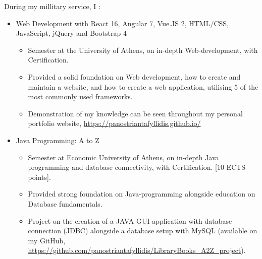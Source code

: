 
During my millitary service, I :
\begin{itemize}
    \item Web Development with React 16, Angular 7, Vue.JS 2, HTML/CSS, JavaScript, jQuery and Bootstrap 4
          \begin{itemize}
              \item Semester at the University of Athens, on in-depth Web-development, with Certification.
              \item Provided a solid foundation on Web development, how to create and maintain a website, and how to create a web application, utilising 5 of the most commonly used frameworks.
              \item Demonstration of my knowledge can be seen throughout my personal portfolio website, \url{https://panostriantafyllidis.github.io/}
          \end{itemize}
    \item Java Programming: A to Z
          \begin{itemize}
              \item Semester at Economic University of Athens, on in-depth Java programming and database connectivity, with Certification. [10 ECTS points].
              \item Provided strong foundation on Java-programming alongside education on Database fundamentals.
              \item Project on the creation of a JAVA GUI application with database connection (JDBC) alongside a database setup with MySQL (available on my GitHub, \url{https://github.com/panostriantafyllidis/LibraryBooks_A2Z_project}).
          \end{itemize}
\end{itemize}


